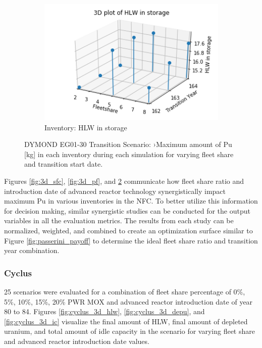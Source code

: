 \begin{figure}[H]
\begin{subfigure}[t]{0.4\textwidth}
    \end{subfigure}
    \begin{subfigure}[t]{0.4\textwidth}
        \centering
        \includegraphics[width=\linewidth]{figures/3d_hlw} 
        \caption{Inventory: HLW in storage}
        \label{fig:3d_hlw}
    \end{subfigure}
    \caption{DYMOND EG01-30 Transition Scenario: ›Maximum amount of Pu [kg] in each inventory during each simulation for varying fleet share and transition start date.}
\end{figure}

Figures \ref{fig:3d_sfc}, \ref{fig:3d_pf}, and \ref{fig:3d_hlw}
communicate how fleet share ratio and introduction date of advanced 
reactor technology 
synergistically impact maximum Pu in various inventories in the 
\gls{NFC}. 
To better utilize this information for decision making, 
similar synergistic studies can be conducted for the output 
variables in all the evaluation metrics. 
The results from each study can be normalized, weighted, and 
combined to create an optimization surface similar 
to Figure \ref{fig:passerini_payoff} to determine the ideal fleet share 
ratio and transition year combination. 

\subsubsection{\textbf{Cyclus}}
25 scenarios were evaluated for a combination of fleet share percentage 
of 0\%, 5\%, 10\%, 15\%, 20\% PWR MOX and advanced reactor introduction 
date of year 80 to 84.
Figures \ref{fig:cyclus_3d_hlw}, \ref{fig:cyclus_3d_depu}, and 
\ref{fig:cyclus_3d_ic}
visualize the final amount of HLW, final amount of depleted uranium, and
total amount of idle capacity in the scenario for varying 
fleet share and advanced reactor introduction date values. 

